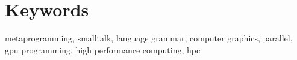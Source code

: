 \chapter*{Keywords}

metaprogramming, smalltalk, language grammar, computer graphics, parallel, gpu programming, high performance computing, hpc
